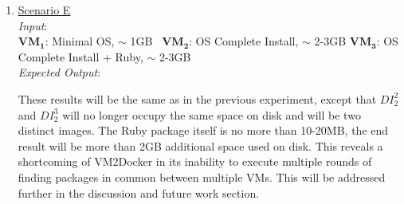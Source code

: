 \begin{enumerate}
\item \underline{Scenario E}\\
\textit{Input}:\\
$\boldsymbol{VM_1}$: Minimal OS, $\sim$ 1GB \textemdash\ $\boldsymbol{VM_2}$: OS Complete Install, $\sim$ 2-3GB \textemdash $\boldsymbol{VM_3}$: OS Complete Install + Ruby, $\sim$ 2-3GB\\


\textit{Expected Output}:


These results will be the same as in the previous experiment, except that $DI_2^2$ and $DI_2^3$ will no longer occupy the same space on disk and will be two distinct images. The Ruby package itself is no more than 10-20MB, the end result will be more than 2GB additional space used on disk. This reveals a shortcoming of VM2Docker in its inability to execute multiple rounds of finding packages in common between multiple VMs. This will be addressed further in the discussion and future work section.
\begin{table}[h]
\centering


\end{table}
\end{enumerate}
